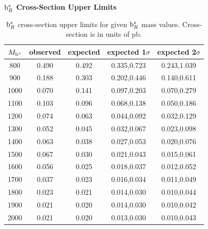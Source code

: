 \clearpage

\begin{table}[htcb]
\begin{center}
\bf{$\mathrm{b}^{*}_{R}$ Cross-Section Upper Limits}\\
\begin{tabular}{|c||c|c|c|c|}
\hline
\bf{$M_{\mathrm{b}^{*}}$} & \bf{observed}  & \bf{expected} & \bf{expected 1$\sigma$}  & \bf{expected 2$\sigma$} \\
\hline
\hline
800 & 0.490 & 0.492 & 0.335,0.723 & 0.243,1.039\\ 
\hline
900 & 0.188 & 0.303 & 0.202,0.446 & 0.140,0.611\\ 
\hline
1000 & 0.070 & 0.141 & 0.097,0.203 & 0.070,0.279\\ 
\hline
1100 & 0.103 & 0.096 & 0.068,0.138 & 0.050,0.186\\ 
\hline
1200 & 0.074 & 0.063 & 0.044,0.092 & 0.032,0.129\\ 
\hline
1300 & 0.052 & 0.045 & 0.032,0.067 & 0.023,0.098\\ 
\hline
1400 & 0.063 & 0.038 & 0.027,0.053 & 0.020,0.076\\ 
\hline
1500 & 0.067 & 0.030 & 0.021,0.043 & 0.015,0.061\\
\hline
1600 & 0.056 & 0.025 & 0.018,0.037 & 0.012,0.052\\ 
\hline
1700 & 0.037 & 0.023 & 0.016,0.034 & 0.011,0.049\\ 
\hline
1800 & 0.023 & 0.021 & 0.014,0.030 & 0.010,0.044\\ 
\hline
1900 & 0.021 & 0.020 & 0.014,0.030 & 0.010,0.042\\ 
\hline
2000 & 0.021 & 0.020 & 0.013,0.030 & 0.010,0.043\\ 
\hline
\end{tabular}
\end{center}
\caption{$\mathrm{b}^{*}_R$ cross-section upper limits for given $\mathrm{b}^{*}_R$ mass values.  Cross-section is in units of pb.}
\label{table:bsupperxsecR}
\end{table}




